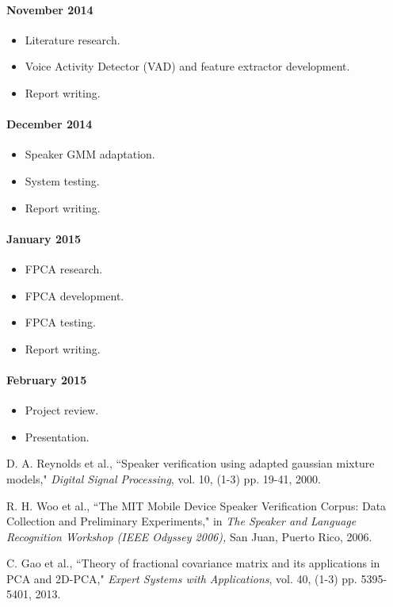 \documentclass[a4paper,twocolumn]{article}
\begin{document}
\paragraph{\textbf{November 2014}}
\begin{itemize}[noitemsep]
    \item Literature research.
    \item Voice Activity Detector (VAD) and feature extractor development.
    \item Report writing.
\end{itemize}

\paragraph{\textbf{December 2014}}
\begin{itemize}[noitemsep]
    \item Speaker GMM adaptation.
    \item System testing.
    \item Report writing.
\end{itemize}

\paragraph{\textbf{January 2015}}
\begin{itemize}[noitemsep]
    \item FPCA research.
    \item FPCA development.
    \item FPCA testing.
    \item Report writing.
\end{itemize}

\paragraph{\textbf{February 2015}}
\begin{itemize}[noitemsep]
    \item Project review.
    \item Presentation.
\end{itemize}


\begin{thebibliography}{9}
        D. A. Reynolds et al.,
        ``Speaker verification using adapted gaussian mixture models,"
        \textit{Digital Signal Processing}, vol. 10,
        (1-3) pp. 19-41,
        2000.

        R. H. Woo et al.,
        ``The MIT Mobile Device Speaker Verification Corpus: Data Collection and Preliminary Experiments,"
        in \textit{The Speaker and Language Recognition Workshop (IEEE Odyssey 2006),}
        San Juan, Puerto Rico, 2006.

        C. Gao et al.,
        ``Theory of fractional covariance matrix and its applications in PCA and 2D-PCA,"
        \textit{Expert Systems with Applications}, vol. 40,
        (1-3) pp. 5395-5401,
        2013.
\end{thebibliography}
\end{document}
